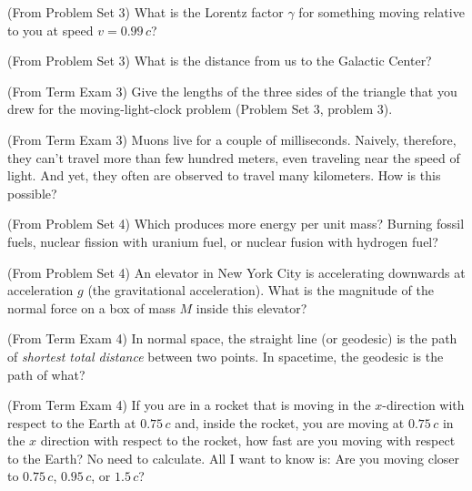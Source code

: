\documentclass[12pt, letterpaper]{article}
\begin{document}
\begin{problem}
  (From Problem Set 3)
  What is the Lorentz factor $\gamma$ for something moving relative
  to you at speed $v = 0.99\,c$?
\end{problem}

\begin{problem}
  (From Problem Set 3)
  What is the distance from us to the Galactic Center?
\end{problem}

\begin{problem}
  (From Term Exam 3)
  Give the lengths of the three sides of the triangle that you drew for the
  moving-light-clock problem (Problem Set 3, problem 3).
\end{problem}

\begin{problem}
  (From Term Exam 3)
  Muons live for a couple of milliseconds. Naively, therefore, they can't travel more than few hundred meters,
even traveling near the speed of light. And yet, they often are observed to travel many kilometers.
How is this possible?
\end{problem}

\begin{problem}
  (From Problem Set 4)
  Which produces more energy per unit mass?
  Burning fossil fuels,
  nuclear fission with uranium fuel, or
  nuclear fusion with hydrogen fuel?
\end{problem}

\begin{problem}
  (From Problem Set 4)
  An elevator in New York City is accelerating downwards
  at acceleration $g$ (the gravitational acceleration).
  What is the magnitude of the normal force on a box of mass $M$ inside this elevator?
\end{problem}

\begin{problem}
  (From Term Exam 4)
  In normal space, the straight line (or geodesic) is the path of \emph{shortest
total distance} between two points. In spacetime, the geodesic is the path
of what?
\end{problem}

\begin{problem}
  (From Term Exam 4)
  If you are in a rocket that is moving in the $x$-direction with
respect to the Earth at $0.75\,c$ and, inside the rocket, you are
moving at $0.75\,c$ in the $x$ direction with respect to the rocket,
how fast are you moving with respect to the Earth? No need to
calculate. All I want to know is: Are you moving closer to $0.75\,c$,
$0.95\,c$, or $1.5\,c$?
\end{problem}
\end{document}
